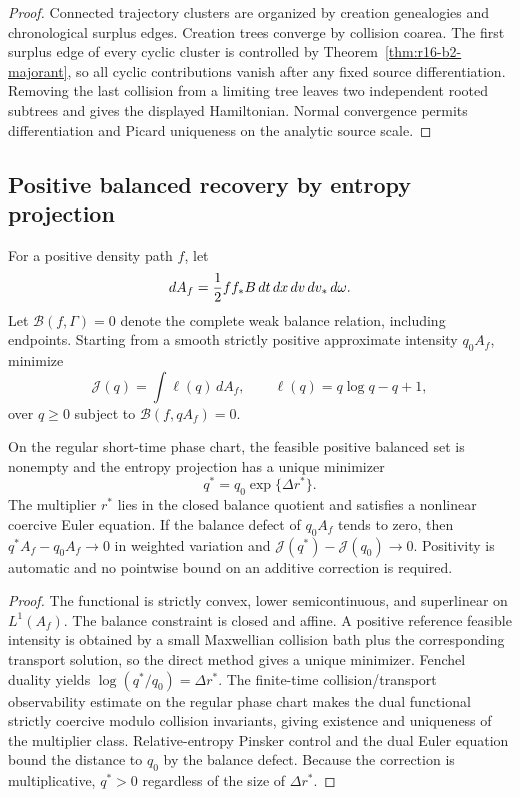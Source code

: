 \begin{proof}
Connected trajectory clusters are organized by creation genealogies and
chronological surplus edges.  Creation trees converge by collision coarea.
The first surplus edge of every cyclic cluster is controlled by
Theorem~\ref{thm:r16-b2-majorant}, so all cyclic contributions vanish after
any fixed source differentiation.  Removing the last collision from a
limiting tree leaves two independent rooted subtrees and gives the displayed
Hamiltonian.  Normal convergence permits differentiation and Picard uniqueness
on the analytic source scale.
\end{proof}

\subsection{Positive balanced recovery by entropy projection}

For a positive density path \(f\), let
\[
 dA_f={1\over2}ff_*B\,dt\,dx\,dv\,dv_*\,d\omega.
\]
Let \(\mathcal B(f,\Gamma)=0\) denote the complete weak balance relation,
including endpoints.  Starting from a smooth strictly positive approximate
intensity \(q_0A_f\), minimize
\[
 \mathcal J(q)=\int\ell(q)\,dA_f,
 \qquad \ell(q)=q\log q-q+1,
\]
over \(q\ge0\) subject to \(\mathcal B(f,qA_f)=0\).

\begin{theorem}
\label{thm:r16-b2-projection}
On the regular short-time phase chart, the feasible positive balanced set is
nonempty and the entropy projection has a unique minimizer
\[
 q^*=q_0\exp\{\Delta r^*\}.
\]
The multiplier \(r^*\) lies in the closed balance quotient and satisfies a
nonlinear coercive Euler equation.  If the balance defect of \(q_0A_f\) tends
to zero, then \(q^*A_f-q_0A_f\to0\) in weighted variation and
\(\mathcal J(q^*)-\mathcal J(q_0)\to0\).  Positivity is automatic and no
pointwise bound on an additive correction is required.
\end{theorem}

\begin{proof}
The functional is strictly convex, lower semicontinuous, and superlinear on
\(L^1(A_f)\).  The balance constraint is closed and affine.  A positive
reference feasible intensity is obtained by a small Maxwellian collision bath
plus the corresponding transport solution, so the direct method gives a
unique minimizer.  Fenchel duality yields
\(\log(q^*/q_0)=\Delta r^*\).  The finite-time collision/transport
observability estimate on the regular phase chart makes the dual functional
strictly coercive modulo collision invariants, giving existence and uniqueness
of the multiplier class.  Relative-entropy Pinsker control and the dual
Euler equation bound the distance to \(q_0\) by the balance defect.  Because
the correction is multiplicative, \(q^*>0\) regardless of the size of
\(\Delta r^*\).
\end{proof}

